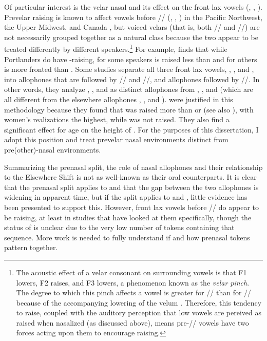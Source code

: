 Of particular interest is the velar nasal and its effect on the front lax vowels (\bang, \beng, \bing). Prevelar raising is known to affect vowels before // (\bag, \beg, \vague) in the Pacific Northwest, the Upper Midwest, and Canada \citep{stanley_submitted_beg}, but voiced velars (that is, both // and //) are not necessarily grouped together as a natural class because the two appear to be treated differently by different speakers.\footnote{The acoustic effect of a velar consonant on surrounding vowels is that F1 lowers, F2 raises, and F3 lowers, a phenomenon known as the \textit{velar pinch}. The degree to which this pinch affects a vowel is greater for // than for // because of the accompanying lowering of the velum \citep{baker_etal_2008}. Therefore, this tendency to raise, coupled with the auditory perception that low vowels are pereived as raised when nasalized (as discussed above), means pre-// vowels have two forces acting upon them to encourage raising.} For example, \citet[46]{conn_2000_diss} finds that while Portlanders do have \ban-raising, for some speakers \bang is raised less than \ban and for others \bang is more fronted than \ban. Some studies separate all three front lax vowels, \kit, \dress, and \trap, into allophones that are followed by // and //, and allophones followed by //. In other words, they analyze \bin, \ben, and \ban as distinct allophones from \bing, \beng, and \bang (which are all different from the elsewhere allophones \bit, \bet, and \bat). \citet[42]{cardoso_etal_2016_pads} were justified in this methodology because they found that \bing was raised more than \bin or \bit (see also \citealt{eckert_2004}), with women's realizations the highest, while \bin was not raised. They also find a significant effect for age on the height of \bang. For the purposes of this dissertation, I adopt this position and treat prevelar nasal environments distinct from pre(other)-nasal environments.

Summarizing the prenasal split, the role of nasal allophones and their relationship to the Elsewhere Shift is not as well-known as their oral counterparts. It is clear that the prenasal split applies to \trap and that the gap between the two allophones is widening in apparent time, but if the split applies to \dress and \kit, little evidence has been presented to support this. However, front lax vowels before // do appear to be raising, at least in studies that have looked at them specifically, though the status of \beng is unclear due to the very low number of tokens containing that sequence. More work is needed to fully understand if and how prenasal tokens pattern together.

